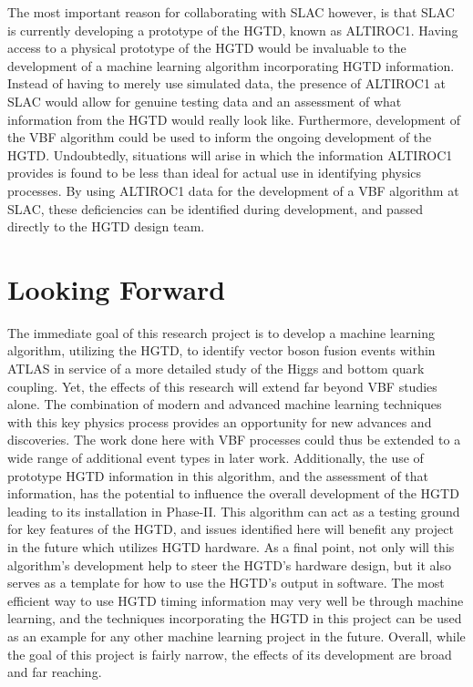 \documentclass[12pt,letterpaper]{article}
\begin{document}
    The most important reason for collaborating with SLAC however, is that SLAC is currently developing a prototype of the HGTD, known as ALTIROC1. Having access to a physical prototype of the HGTD would be invaluable to the development of a machine learning algorithm incorporating HGTD information. Instead of having to merely use simulated data, the presence of ALTIROC1 at SLAC would allow for genuine testing data and an assessment of what information from the HGTD would really look like. Furthermore, development of the VBF algorithm could be used to inform the ongoing development of the HGTD. Undoubtedly, situations will arise in which the information ALTIROC1 provides is found to be less than ideal for actual use in identifying physics processes. By using ALTIROC1 data for the development of a VBF algorithm at SLAC, these deficiencies can be identified during development, and passed directly to the HGTD design team. 




\section*{Looking Forward}
    The immediate goal of this research project is to develop a machine learning algorithm, utilizing the HGTD, to identify vector boson fusion events within ATLAS in service of a more detailed study of the Higgs and bottom quark coupling. Yet, the effects of this research will extend far beyond VBF studies alone. The combination of modern and advanced machine learning techniques with this key physics process provides an opportunity for new advances and discoveries. The work done here with VBF processes could thus be extended to a wide range of additional event types in later work. Additionally, the use of prototype HGTD information in this algorithm, and the assessment of that information, has the potential to influence the overall development of the HGTD leading to its installation in Phase-II. This algorithm can act as a testing ground for key features of the HGTD, and issues identified here will benefit any project in the future which utilizes HGTD hardware. As a final point, not only will this algorithm's development help to steer the HGTD's hardware design, but it also serves as a template for how to use the HGTD's output in software. The most efficient way to use HGTD timing information may very well be through machine learning, and the techniques incorporating the HGTD in this project can be used as an example for any other machine learning project in the future. Overall, while the goal of this project is fairly narrow, the effects of its development are broad and far reaching.




\newpage
\begin{appendix}
\end{appendix}





\end{document}
